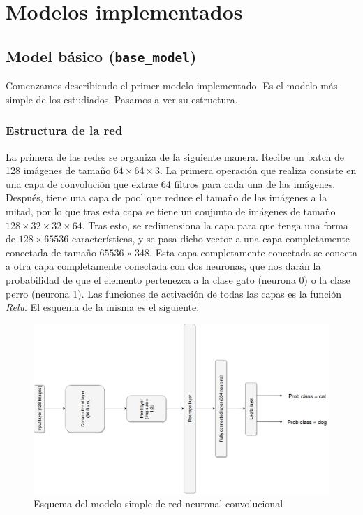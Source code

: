 \documentclass[11pt]{article}
\theoremstyle{plain}
\theoremstyle{definition}
\begin{document}
\section{Modelos implementados}

\subsection{Model básico (\texttt{base\_model})}

Comenzamos describiendo el primer modelo implementado. Es el modelo
más simple de los estudiados. Pasamos a ver su estructura.

\subsubsection{Estructura de la red}

La primera de las redes se organiza de la siguiente manera. Recibe un
batch de 128 imágenes de tamaño $64 \times 64\times 3$. La primera
operación que realiza consiste en una capa de convolución que extrae
64 filtros para cada una de las imágenes. Después, tiene una capa de
pool que reduce el tamaño de las imágenes a la mitad, por lo que tras
esta capa se tiene un conjunto de imágenes de tamaño
$128 \times 32 \times 32 \times 64$. Tras esto, se redimensiona la
capa para que tenga una forma de $128 \times 65536$ características, y
se pasa dicho vector a una capa completamente conectada de tamaño
$65536 \times 348$.  Esta capa completamente conectada se conecta a
otra capa completamente conectada con dos neuronas, que nos darán la
probabilidad de que el elemento pertenezca a la clase gato (neurona 0)
o la clase perro (neurona 1). Las funciones de activación de todas las
capas es la función \textit{Relu}. El esquema de la misma es el siguiente:

\begin{figure}[H]
  \centering
  \includegraphics[width=.7\textwidth]{imgs/simple_model.png}  
  \caption{Esquema del modelo simple de red neuronal convolucional}
\end{figure}
\end{document}
